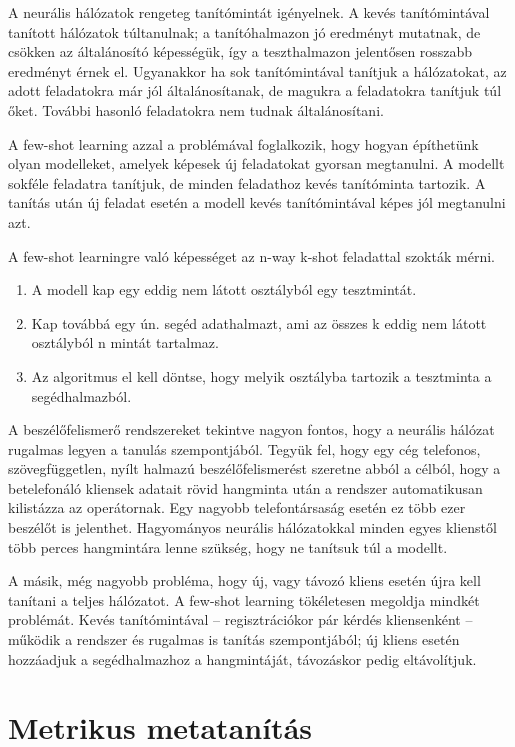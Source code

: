 A neurális hálózatok rengeteg
tanítómintát igényelnek. A kevés tanítómintával
tanított hálózatok túltanulnak; a tanítóhalmazon jó eredményt mutatnak, de csökken az általánosító képességük, így a teszthalmazon jelentősen rosszabb eredményt érnek el. Ugyanakkor ha sok tanítómintával tanítjuk a hálózatokat, az adott feladatokra már jól általánosítanak, de magukra a feladatokra tanítjuk túl őket. További hasonló feladatokra nem tudnak általánosítani.

A few-shot learning azzal a problémával foglalkozik, hogy hogyan építhetünk olyan modelleket, amelyek képesek új feladatokat gyorsan megtanulni. A
modellt sokféle feladatra tanítjuk, de minden feladathoz kevés tanítóminta tartozik. A tanítás után új feladat esetén a modell kevés tanítómintával képes jól megtanulni azt. 

A few-shot learningre való képességet az n-way k-shot feladattal szokták mérni. 

\begin{enumerate}
	\item A modell kap egy eddig nem látott osztályból egy tesztmintát.
	\item Kap továbbá egy ún. segéd adathalmazt, ami az összes k eddig nem látott osztályból n mintát tartalmaz.
	\item Az algoritmus el kell döntse, hogy melyik osztályba tartozik a tesztminta a segédhalmazból.
\end{enumerate}

A beszélőfelismerő rendszereket tekintve nagyon fontos, hogy a neurális hálózat rugalmas legyen a tanulás szempontjából. Tegyük fel, hogy egy cég telefonos, szövegfüggetlen,
nyílt halmazú beszélőfelismerést szeretne abból a célból, hogy a betelefonáló kliensek adatait rövid hangminta után a rendszer automatikusan kilistázza az operátornak.
Egy nagyobb telefontársaság esetén ez több ezer beszélőt is jelenthet. Hagyományos neurális hálózatokkal minden egyes klienstől több perces hangmintára lenne szükség,
hogy ne tanítsuk túl a modellt. 

A másik, még nagyobb probléma, hogy új, vagy távozó kliens esetén újra kell tanítani a teljes hálózatot. A few-shot learning tökéletesen
megoldja mindkét problémát. Kevés tanítómintával -- regisztrációkor pár kérdés kliensenként -- működik a rendszer és rugalmas is tanítás szempontjából; új kliens esetén
hozzáadjuk a segédhalmazhoz a hangmintáját, távozáskor pedig eltávolítjuk.

\section{Metrikus metatanítás}

